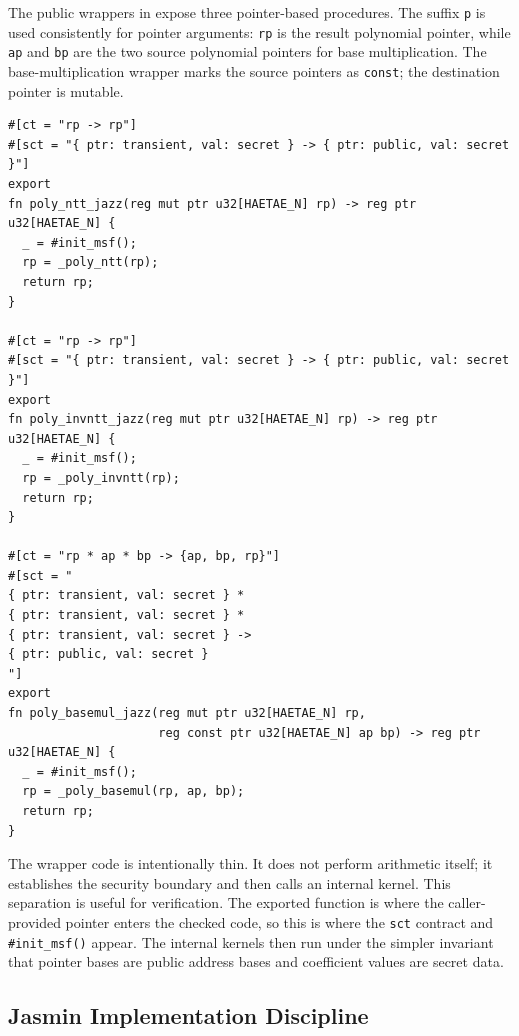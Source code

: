 \documentclass[10pt,twocolumn]{article}
\begin{document}
The public wrappers in  expose three pointer-based procedures.
The suffix \texttt{p} is used consistently for pointer arguments: \texttt{rp}
is the result polynomial pointer, while \texttt{ap} and \texttt{bp} are the two
source polynomial pointers for base multiplication.  The base-multiplication
wrapper marks the source pointers as \texttt{const}; the destination pointer is
mutable.

\newpage
\begin{lstlisting}[caption={Exported wrapper shape in \texttt{hpoly.jazz}.},label={lst:wrappers}]
#[ct = "rp -> rp"]
#[sct = "{ ptr: transient, val: secret } -> { ptr: public, val: secret }"]
export
fn poly_ntt_jazz(reg mut ptr u32[HAETAE_N] rp) -> reg ptr u32[HAETAE_N] {
  _ = #init_msf();
  rp = _poly_ntt(rp);
  return rp;
}

#[ct = "rp -> rp"]
#[sct = "{ ptr: transient, val: secret } -> { ptr: public, val: secret }"]
export
fn poly_invntt_jazz(reg mut ptr u32[HAETAE_N] rp) -> reg ptr u32[HAETAE_N] {
  _ = #init_msf();
  rp = _poly_invntt(rp);
  return rp;
}

#[ct = "rp * ap * bp -> {ap, bp, rp}"]
#[sct = "
{ ptr: transient, val: secret } *
{ ptr: transient, val: secret } *
{ ptr: transient, val: secret } ->
{ ptr: public, val: secret }
"]
export
fn poly_basemul_jazz(reg mut ptr u32[HAETAE_N] rp,
                     reg const ptr u32[HAETAE_N] ap bp) -> reg ptr u32[HAETAE_N] {
  _ = #init_msf();
  rp = _poly_basemul(rp, ap, bp);
  return rp;
}
\end{lstlisting}

The wrapper code is intentionally thin.  It does not perform arithmetic itself;
it establishes the security boundary and then calls an internal kernel.  This
separation is useful for verification.  The exported function is where the
caller-provided pointer enters the checked code, so this is where the
\texttt{sct} contract and \texttt{\#init\_msf()} appear.  The internal kernels
then run under the simpler invariant that pointer bases are public address
bases and coefficient values are secret data.

\subsection{Jasmin Implementation Discipline}
\end{document}
